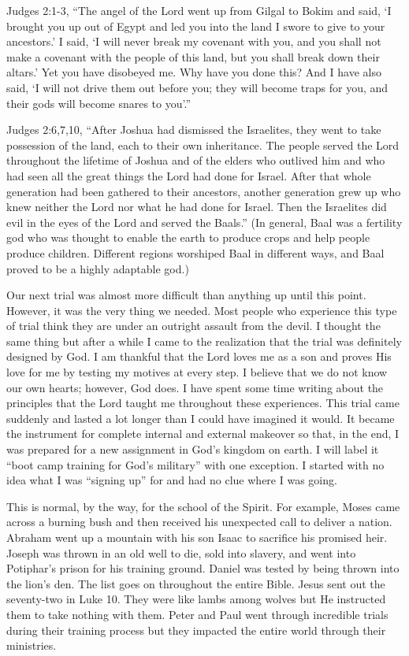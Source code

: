 \documentclass[oneside]{book}
\begin{document}
Judges 2:1-3,  “The angel of the Lord went up from Gilgal to Bokim and said, ‘I brought you up out of Egypt and led you into the land I swore to give to your ancestors.’ I said, ‘I will never break my covenant with you, and you shall not make a covenant with the people of this land, but you shall break down their altars.’ Yet you have disobeyed me. Why have you done this? And I have also said, ‘I will not drive them out before you; they will become traps for you, and their gods will become snares to you’.” 

Judges 2:6,7,10, “After Joshua had dismissed the Israelites, they went to take possession of the land, each to their own inheritance. The people served the Lord throughout the lifetime of Joshua and of the elders who outlived him and who had seen all the great things the Lord had done for Israel. After that whole generation had been gathered to their ancestors, another generation grew up who knew neither the Lord nor what he had done for Israel. Then the Israelites did evil in the eyes of the Lord and served the Baals.” (In general, Baal was a fertility god who was thought to enable the earth to produce crops and help people produce children. Different regions worshiped Baal in different ways, and Baal proved to be a highly adaptable god.)

Our next trial was almost more difficult than anything up until this point. However, it was the very thing we needed. Most people who experience this type of trial think they are under an outright assault from the devil. I thought the same thing but after a while I came to the realization that the trial was definitely designed by God. I am thankful that the Lord loves me as a son and proves His love for me by testing my motives at every step. I believe that we do not know our own hearts; however, God does. I have spent some time writing about the principles that the Lord taught me throughout these experiences. This trial came suddenly and lasted a lot longer than I could have imagined it would. It became the instrument for complete internal and external makeover so that, in the end, I was prepared for a new assignment in God’s kingdom on earth. I will label it “boot camp training for God’s military” with one exception. I started with no idea what I was “signing up” for and had no clue where I was going. 

This is normal, by the way, for the school of the Spirit. For example, Moses came across a burning bush and then received his unexpected call to deliver a nation. Abraham went up a mountain with his son Isaac to sacrifice his promised heir. Joseph was thrown in an old well to die, sold into slavery, and went into Potiphar's prison for his training ground. Daniel was tested by being thrown into the lion's den. The list goes on throughout the entire Bible. Jesus sent out the seventy-two in Luke 10. They were like lambs among wolves but He instructed them to take nothing with them. Peter and Paul went through incredible trials during their training process but they impacted the entire world through their ministries.
\end{document}
